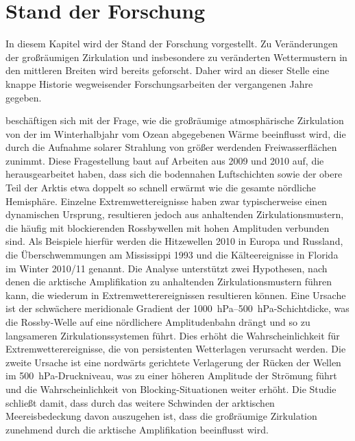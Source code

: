 \chapter{Stand der Forschung} \label{ch:hintergrund}

In diesem Kapitel wird der Stand der Forschung vorgestellt. Zu Veränderungen der großräumigen Zirkulation und insbesondere zu veränderten Wettermustern in den mittleren Breiten wird bereits geforscht. Daher wird an dieser Stelle eine knappe Historie wegweisender Forschungsarbeiten der vergangenen Jahre gegeben.

\citet{francis-2012} beschäftigen sich mit der Frage, wie die großräumige atmosphärische Zirkulation von der im Winterhalbjahr vom Ozean abgegebenen Wärme beeinflusst wird, die durch die Aufnahme solarer Strahlung von größer werdenden Freiwasserflächen zunimmt. Diese Fragestellung baut auf Arbeiten aus 2009 und 2010 auf, die herausgearbeitet haben, dass sich die bodennahen Luftschichten sowie der obere Teil der Arktis etwa doppelt so schnell erwärmt wie die gesamte nördliche Hemisphäre. Einzelne Extremwettereignisse haben zwar typischerweise einen dynamischen Ursprung, resultieren jedoch aus anhaltenden Zirkulationsmustern, die häufig mit blockierenden Rossbywellen mit hohen Amplituden verbunden sind. Als Beispiele hierfür werden die Hitzewellen 2010 in Europa und Russland, die Überschwemmungen am Mississippi 1993 und die Kälteereignisse in Florida im Winter 2010/11 genannt. 
Die Analyse unterstützt zwei Hypothesen, nach denen die arktische Amplifikation zu anhaltenden Zirkulationsmustern führen kann, die wiederum in Extremwetterereignissen resultieren können. Eine Ursache ist der schwächere meridionale Gradient der \SIrange{1000}{500}{\hecto\pascal}-Schichtdicke, was die Rossby-Welle auf eine nördlichere Amplitudenbahn drängt und so zu langsameren Zirkulationssystemen führt. Dies erhöht die Wahrscheinlichkeit für Extremwetterereignisse, die von persistenten Wetterlagen verursacht werden. Die zweite Ursache ist eine nordwärts gerichtete Verlagerung der Rücken der Wellen im \SI{500}{\hecto\pascal}-Druckniveau, was zu einer höheren Amplitude der Strömung führt und die Wahrscheinlichkeit von Blocking-Situationen weiter erhöht. Die Studie schließt damit, dass durch das weitere Schwinden der arktischen Meereisbedeckung davon auszugehen ist, dass die großräumige Zirkulation zunehmend durch die arktische Amplifikation beeinflusst wird.

